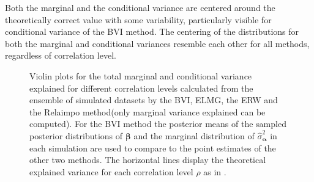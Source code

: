 Both the marginal and the conditional variance are centered around the theoretically correct value with some variability, particularly visible for conditional variance of the BVI method. 
The centering of the distributions for both the marginal and conditional variances resemble each other for all methods, regardless of correlation level.
\begin{figure}[!ht]
  \centering
  \hfill
  \caption{Violin plots for the total marginal and conditional variance explained for different correlation levels calculated from the ensemble of simulated datasets by the BVI, ELMG, the ERW and the Relaimpo method(only marginal variance explained can be computed). For the BVI method the posterior means of the sampled posterior distributions of $\boldsymbol{\beta}$ and the marginal distribution of $\hat{\sigma}^2_{\boldsymbol{\alpha}}$ in each simulation are used to compare to the point estimates of the other two methods. The horizontal lines display the theoretical explained variance for each correlation level $\rho$ as in .}
  \label{fig:total_variance}
\end{figure}

\newpage
